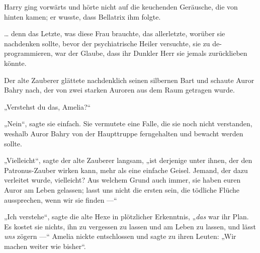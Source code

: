 Harry ging vorwärts und hörte nicht auf die keuchenden Geräusche, die von hinten kamen; er wusste, dass Bellatrix ihm folgte.

… denn das Letzte, was diese Frau brauchte, das allerletzte, worüber sie nachdenken sollte, bevor der psychiatrische Heiler versuchte, sie zu de-programmieren, war der Glaube, dass ihr Dunkler Herr sie jemals zurücklieben könnte.

\later

Der alte Zauberer glättete nachdenklich seinen silbernen Bart und schaute Auror Bahry nach, der von zwei starken Auroren aus dem Raum getragen wurde.

„Verstehst du das, Amelia?“

„Nein“, sagte sie einfach. Sie vermutete eine Falle, die sie noch nicht verstanden, weshalb Auror Bahry von der Haupttruppe ferngehalten und bewacht werden sollte.

„Vielleicht“, sagte der alte Zauberer langsam, „ist derjenige unter ihnen, der den Patronus-Zauber wirken kann, mehr als eine einfache Geisel. Jemand, der dazu verleitet wurde, vielleicht? Aus welchem Grund auch immer, sie haben euren Auror am Leben gelassen; lasst uns nicht die ersten sein, die tödliche Flüche aussprechen, wenn wir sie finden —“

„Ich verstehe“, sagte die alte Hexe in plötzlicher Erkenntnis,
„\emph{das} war ihr Plan. Es kostet sie nichts, ihn zu vergessen zu lassen und am Leben zu lassen, und lässt \emph{uns} zögern —“ Amelia nickte entschlossen und sagte zu ihren Leuten:
„Wir machen weiter wie bisher“.

